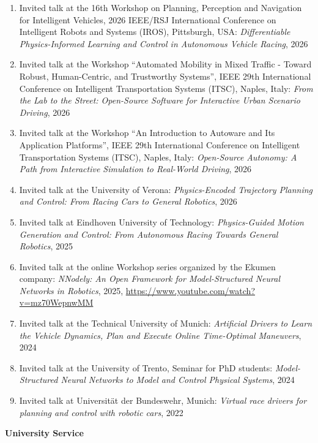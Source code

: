 \begin{enumerate}
    \item Invited talk at the 16th Workshop on Planning, Perception and Navigation for Intelligent Vehicles, 2026 IEEE/RSJ International Conference on Intelligent Robots and Systems (IROS), Pittsburgh, USA: \textit{Differentiable Physics-Informed Learning and Control in Autonomous Vehicle Racing}, 2026
    \item Invited talk at the Workshop ``Automated Mobility in Mixed Traffic - Toward Robust, Human-Centric, and Trustworthy Systems'', IEEE 29th International Conference on Intelligent Transportation Systems (ITSC), Naples, Italy: \textit{From the Lab to the Street: Open-Source Software for Interactive Urban Scenario Driving}, 2026
    \item Invited talk at the Workshop ``An Introduction to Autoware and Its Application Platforms'', IEEE 29th International Conference on Intelligent Transportation Systems (ITSC), Naples, Italy: \textit{Open-Source Autonomy: A Path from Interactive Simulation to Real-World Driving}, 2026
    \item Invited talk at the University of Verona: \textit{Physics-Encoded Trajectory Planning and Control: From Racing Cars to General Robotics}, 2026
    \item Invited talk at Eindhoven University of Technology: \textit{Physics-Guided Motion Generation and Control: From Autonomous Racing Towards General Robotics}, 2025
    \item Invited talk at the online Workshop series organized by the Ekumen company: \textit{NNodely: An Open Framework for Model-Structured Neural Networks in Robotics}, 2025, \url{https://www.youtube.com/watch?v=mz70WepnwMM}
    \item Invited talk at the Technical University of Munich: \textit{Artificial Drivers to Learn the Vehicle Dynamics, Plan and Execute Online Time-Optimal Maneuvers}, 2024
    \item Invited talk at the University of Trento, Seminar for PhD students: \textit{Model-Structured Neural Networks to Model and Control Physical Systems}, 2024
    \item Invited talk at Universität der Bundeswehr, Munich: \textit{Virtual race drivers for planning and control with robotic cars}, 2022
\end{enumerate}

\vspace{0.2cm}
{\large\bfseries\sffamily University Service}

